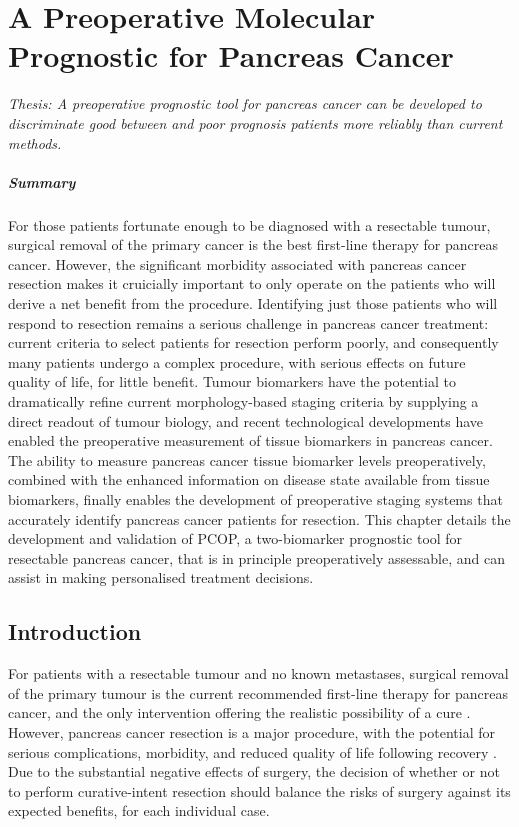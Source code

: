 \documentclass[dissertation.tex]{subfiles}
\begin{document}
\chapter{A Preoperative Molecular Prognostic for Pancreas Cancer}
\label{chap:nomogram}

\emph{Thesis: A preoperative prognostic tool for pancreas cancer can be developed to discriminate good between and poor prognosis patients more reliably than current methods.}

\paragraph{Summary}
For those patients fortunate enough to be diagnosed with a resectable tumour, surgical removal of the primary cancer is the best first-line therapy for pancreas cancer.  However, the significant morbidity associated with pancreas cancer resection makes it cruicially important to only operate on the patients who will derive a net benefit from the procedure.  Identifying just those patients who will respond to resection remains a serious challenge in pancreas cancer treatment: current criteria to select patients for resection perform poorly, and consequently many patients undergo a complex procedure, with serious effects on future quality of life, for little benefit.  Tumour biomarkers have the potential to dramatically refine current morphology-based staging criteria by supplying a direct readout of tumour biology, and recent technological developments have enabled the preoperative measurement of tissue biomarkers in pancreas cancer.  The ability to measure pancreas cancer tissue biomarker levels preoperatively, combined with the enhanced information on disease state available from tissue biomarkers, finally enables the development of preoperative staging systems that accurately identify pancreas cancer patients for resection.  This chapter details the development and validation of \gls{PCOP}, a two-biomarker prognostic tool for resectable pancreas cancer, that is in principle preoperatively assessable, and can assist in making personalised treatment decisions.


\section{Introduction}
For patients with a resectable tumour and no known metastases, surgical removal of the primary tumour is the current recommended first-line therapy for pancreas cancer, and the only intervention offering the realistic possibility of a cure \cite{Editors2015}.  However, pancreas cancer resection is a major procedure, with the potential for serious complications, morbidity, and reduced quality of life following recovery \cite{Ho2005}.  Due to the substantial negative effects of surgery, the decision of whether or not to perform curative-intent resection should balance the risks of surgery against its expected benefits, for each individual case.
\end{document}
